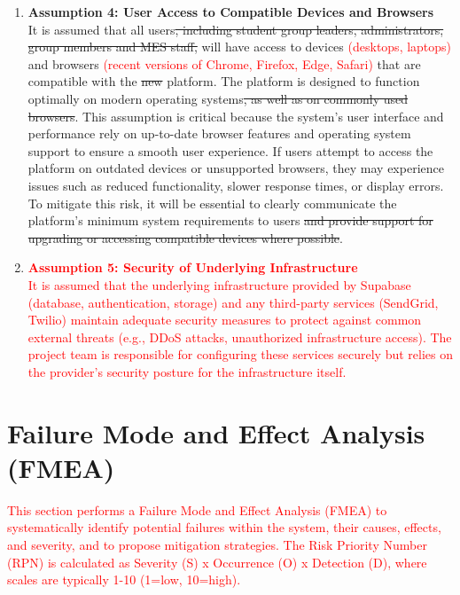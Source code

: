 \documentclass{article}
\begin{document}
\begin{enumerate}
    \item \textbf{Assumption 4: User Access to Compatible Devices and Browsers} \\
    It is assumed that all users\sout{, including student group leaders, administrators, group members and MES staff,} will have access to devices \textcolor{red}{(desktops, laptops)} and browsers \textcolor{red}{(recent versions of Chrome, Firefox, Edge, Safari)} that are compatible with the \sout{new} platform. The platform is designed to function optimally on modern operating systems\sout{, as well as on commonly used browsers}. This assumption is critical because the system's user interface and performance rely on up-to-date browser features and operating system support to ensure a smooth user experience. If users attempt to access the platform on outdated devices or unsupported browsers, they may experience issues such as reduced functionality, slower response times, or display errors. To mitigate this risk, it will be essential to clearly communicate the platform's minimum system requirements to users \sout{and provide support for upgrading or accessing compatible devices where possible}.

    \item \textcolor{red}{\textbf{Assumption 5: Security of Underlying Infrastructure}} \\
    \textcolor{red}{It is assumed that the underlying infrastructure provided by Supabase (database, authentication, storage) and any third-party services (SendGrid, Twilio) maintain adequate security measures to protect against common external threats (e.g., DDoS attacks, unauthorized infrastructure access). The project team is responsible for configuring these services securely but relies on the provider's security posture for the infrastructure itself.}

\end{enumerate}

\newpage %

\section{Failure Mode and Effect Analysis (FMEA)}

\textcolor{red}{
This section performs a Failure Mode and Effect Analysis (FMEA) to systematically identify potential failures within the \progname{} system, their causes, effects, and severity, and to propose mitigation strategies. The Risk Priority Number (RPN) is calculated as Severity (S) x Occurrence (O) x Detection (D), where scales are typically 1-10 (1=low, 10=high).}
\end{document}

